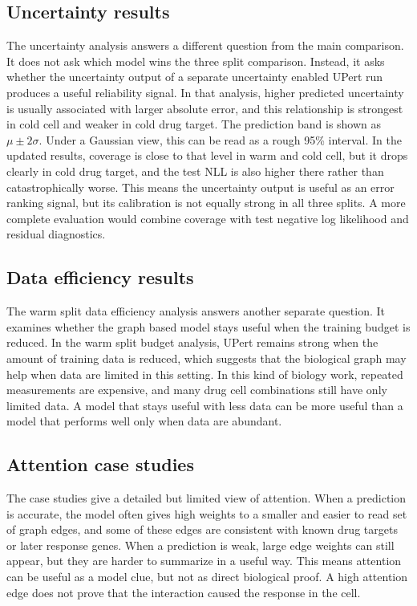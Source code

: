 \subsection{Uncertainty results}
\noindent The uncertainty analysis answers a different question from the main comparison. It does not ask which model wins the three split comparison. Instead, it asks whether the uncertainty output of a separate uncertainty enabled UPert run produces a useful reliability signal. In that analysis, higher predicted uncertainty is usually associated with larger absolute error, and this relationship is strongest in cold cell and weaker in cold drug target. The prediction band is shown as $\mu \pm 2\sigma$. Under a Gaussian view, this can be read as a rough 95\% interval. In the updated results, coverage is close to that level in warm and cold cell, but it drops clearly in cold drug target, and the test NLL is also higher there rather than catastrophically worse. This means the uncertainty output is useful as an error ranking signal, but its calibration is not equally strong in all three splits. A more complete evaluation would combine coverage with test negative log likelihood and residual diagnostics.

\subsection{Data efficiency results}
\noindent The warm split data efficiency analysis answers another separate question. It examines whether the graph based model stays useful when the training budget is reduced. In the warm split budget analysis, UPert remains strong when the amount of training data is reduced, which suggests that the biological graph may help when data are limited in this setting. In this kind of biology work, repeated measurements are expensive, and many drug cell combinations still have only limited data. A model that stays useful with less data can be more useful than a model that performs well only when data are abundant.

\subsection{Attention case studies}
\noindent The case studies give a detailed but limited view of attention. When a prediction is accurate, the model often gives high weights to a smaller and easier to read set of graph edges, and some of these edges are consistent with known drug targets or later response genes. When a prediction is weak, large edge weights can still appear, but they are harder to summarize in a useful way. This means attention can be useful as a model clue, but not as direct biological proof. A high attention edge does not prove that the interaction caused the response in the cell.

